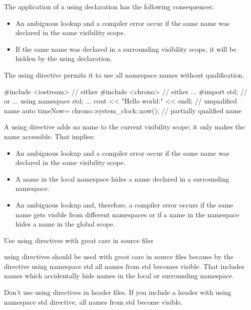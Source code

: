 The application of a using declaration has the following consequences:

\begin{itemize}
\item
An ambiguous lookup and a compiler error occur if the same name was declared in the same visibility scope.

\item
If the same name was declared in a surrounding visibility scope, it will be hidden by the using declaration.
\end{itemize}


The using directive permits it to use all namespace names without qualification.

\begin{cpp}
#include <iostream> // either
#include <chrono> // either
...
#import std; // or
...
using namespace std;
...
cout << "Hello world:" << endl; // unqualified name
auto timeNow= chrono::system_clock::now(); // partially qualified name
\end{cpp}

A using directive adds no name to the current visibility scope; it only makes the name accessible. That implies:

\begin{itemize}
\item
An ambiguous lookup and a compiler error occur if the same name was declared in the same visibility scope.

\item
A name in the local namespace hides a name declared in a surrounding namespace.

\item
An ambiguous lookup and, therefore, a compiler error occurs if the same name gets visible from different namespaces or if a name in the namespace hides a name in the global scope.
\end{itemize}

\begin{myWarning}{Use using directives with great care in source files}

using directives should be used with great care in source files because by the directive using namespace std all names from std becomes visible. That includes names which accidentally hide names in the local or surrounding namespace.

Don’t use using directives in header files. If you include a header with using namespace std directive, all names from std become visible.

\end{myWarning}

